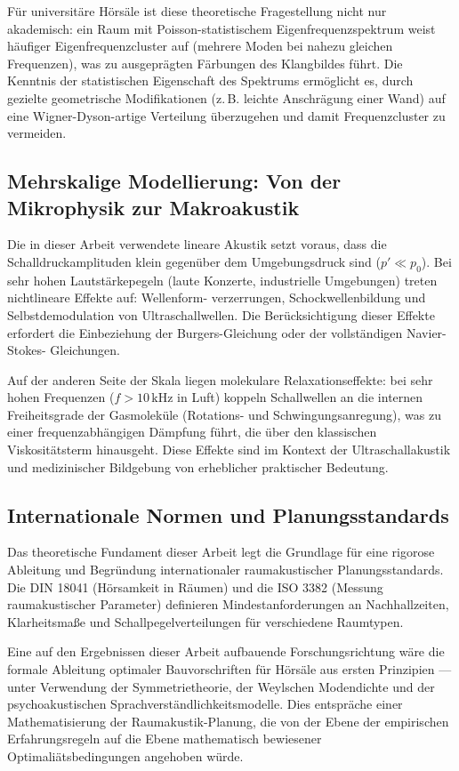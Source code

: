 ﻿\documentclass[12pt, a4paper]{article}
\theoremstyle{definition}
\theoremstyle{remark}
\begin{document}
Für universitäre Hörsäle ist diese theoretische Fragestellung nicht nur
akademisch: ein Raum mit Poisson-statistischem Eigenfrequenzspektrum
weist häufiger Eigenfrequenzcluster auf (mehrere Moden bei nahezu
gleichen Frequenzen), was zu ausgeprägten Färbungen des Klangbildes
führt. Die Kenntnis der statistischen Eigenschaft des Spektrums ermöglicht
es, durch gezielte geometrische Modifikationen (z.\,B. leichte Anschrägung
einer Wand) auf eine Wigner-Dyson-artige Verteilung überzugehen und
damit Frequenzcluster zu vermeiden.

\subsection{Mehrskalige Modellierung: Von der Mikrophysik zur Makroakustik}

Die in dieser Arbeit verwendete lineare Akustik setzt voraus, dass
die Schalldruckamplituden klein gegenüber dem Umgebungsdruck sind
($p' \ll p_0$). Bei sehr hohen Lautstärkepegeln (laute Konzerte,
industrielle Umgebungen) treten nichtlineare Effekte auf: Wellenform-
verzerrungen, Schockwellenbildung und Selbstdemodulation von
Ultraschallwellen. Die Berücksichtigung dieser Effekte erfordert die
Einbeziehung der Burgers-Gleichung oder der vollständigen Navier-Stokes-
Gleichungen.

Auf der anderen Seite der Skala liegen molekulare Relaxationseffekte:
bei sehr hohen Frequenzen ($f > 10\,\mathrm{kHz}$ in Luft) koppeln
Schallwellen an die internen Freiheitsgrade der Gasmoleküle
(Rotations- und Schwingungsanregung), was zu einer frequenzabhängigen
Dämpfung führt, die über den klassischen Viskositätsterm hinausgeht.
Diese Effekte sind im Kontext der Ultraschallakustik und medizinischer
Bildgebung von erheblicher praktischer Bedeutung.

\subsection{Internationale Normen und Planungsstandards}

Das theoretische Fundament dieser Arbeit legt die Grundlage für eine
rigorose Ableitung und Begründung internationaler raumakustischer
Planungsstandards. Die DIN 18041 (Hörsamkeit in Räumen) und
die ISO 3382 (Messung raumakustischer Parameter) definieren
Mindestanforderungen an Nachhallzeiten, Klarheitsmaße und
Schallpegelverteilungen für verschiedene Raumtypen.

Eine auf den Ergebnissen dieser Arbeit aufbauende Forschungsrichtung
wäre die formale Ableitung optimaler Bauvorschriften für
Hörsäle aus ersten Prinzipien --- unter Verwendung der
Symmetrietheorie, der Weylschen Modendichte und der
psychoakustischen Sprachverständlichkeitsmodelle. Dies entspräche
einer Mathematisierung der Raumakustik-Planung, die von der
Ebene der empirischen Erfahrungsregeln auf die Ebene mathematisch
bewiesener Optimaliätsbedingungen angehoben würde.
\end{document}
